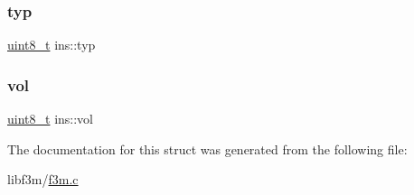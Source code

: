 \mbox{\label{structins_a59e5fac19c5b9fde60f045f1cd44f695}} 
\subsubsection{\texorpdfstring{typ}{typ}}
{\footnotesize\ttfamily \hyperlink{inttypes_8h_aba7bc1797add20fe3efdf37ced1182c5}{uint8\+\_\+t} ins\+::typ}

\mbox{\label{structins_ada1b49154d9c1d8050da37526a18335b}} 
\subsubsection{\texorpdfstring{vol}{vol}}
{\footnotesize\ttfamily \hyperlink{inttypes_8h_aba7bc1797add20fe3efdf37ced1182c5}{uint8\+\_\+t} ins\+::vol}



The documentation for this struct was generated from the following file\+:\begin{DoxyCompactItemize}
\item 
libf3m/\hyperlink{f3m_8c}{f3m.\+c}\end{DoxyCompactItemize}
